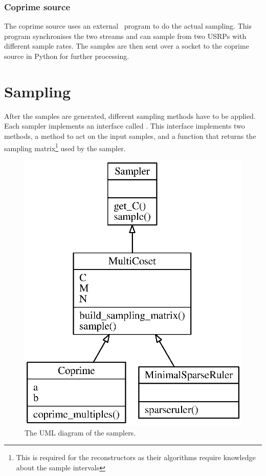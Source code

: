 \documentclass[a4paper, openany, oneside]{memoir}
\begin{document}
\subsubsection{Coprime source}
The coprime source uses an external \CC~program to do the actual sampling. This program synchronises the two streams and can sample from two USRPs with different sample rates. The samples are then sent over a socket to the coprime source in Python for further processing.


\section{Sampling}
\label{sec:sampling}
After the samples are generated, different sampling methods have to be applied. Each sampler implements an interface called . This interface implements two methods, a  method to act on the input samples, and a  function that returns the sampling matrix\footnote{This is required for the reconstructors as their algorithms require knowledge about the sample intervals} used by the sampler.

\begin{figure}
    \centering
    \includegraphics{./figures/classes_sampling.eps}
    \caption{The UML diagram of the samplers.}
    \label{fig:}
\end{figure}
\end{document}
